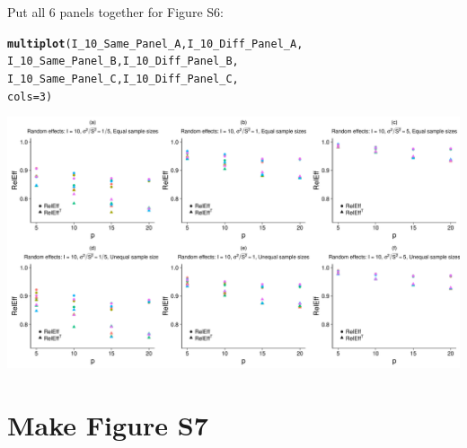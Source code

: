 \documentclass{article}\usepackage[]{graphicx}\usepackage[]{color}
\makeatletter
\def\maxwidth{ %
  \ifdim\Gin@nat@width>\linewidth
    \linewidth
  \else
    \Gin@nat@width
  \fi
}
\newcommand{\hlnum}[1]{\textcolor[rgb]{0.686,0.059,0.569}{#1}}%
\newcommand{\hlstd}[1]{\textcolor[rgb]{0.345,0.345,0.345}{#1}}%
\newcommand{\hlkwc}[1]{\textcolor[rgb]{0.333,0.667,0.333}{#1}}%
\newcommand{\hlkwd}[1]{\textcolor[rgb]{0.737,0.353,0.396}{\textbf{#1}}}%
\newenvironment{kframe}{%
 \def\at@end@of@kframe{}%
 \ifinner\ifhmode%
  \def\at@end@of@kframe{\end{minipage}}%
  \begin{minipage}{\columnwidth}%
 \fi\fi%
 \def\FrameCommand##1{\hskip\@totalleftmargin \hskip-\fboxsep
 \colorbox{shadecolor}{##1}\hskip-\fboxsep
     \hskip-\linewidth \hskip-\@totalleftmargin \hskip\columnwidth}%
 \MakeFramed {\advance\hsize-\width
   \@totalleftmargin\z@ \linewidth\hsize
   \@setminipage}}%
 {\par\unskip\endMakeFramed%
 \at@end@of@kframe}
\newenvironment{knitrout}{}{} %
\makeatother
\begin{document}
Put all 6 panels together for Figure S6:

\begin{knitrout}
\color{fgcolor}\begin{kframe}
\begin{alltt}
\hlkwd{multiplot}\hlstd{(I_10_Same_Panel_A, I_10_Diff_Panel_A,}
          \hlstd{I_10_Same_Panel_B, I_10_Diff_Panel_B,}
          \hlstd{I_10_Same_Panel_C, I_10_Diff_Panel_C,}
          \hlkwc{cols}\hlstd{=}\hlnum{3}\hlstd{)}
\end{alltt}


{\ttfamily\noindent\itshape\color{messagecolor}{\#\# Loading required package: grid}}\end{kframe}

{\centering \includegraphics[width=\maxwidth]{figures/Figure_S6_panels-1} 

}



\end{knitrout}

\section{Make Figure S7}
\end{document}
